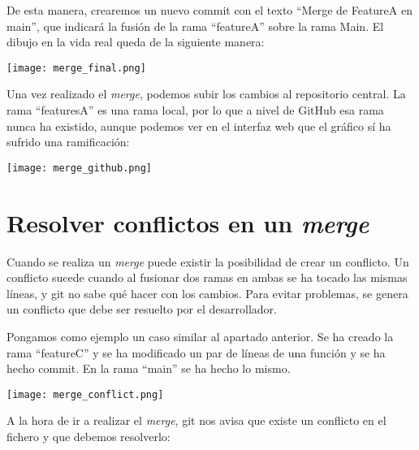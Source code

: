 De esta manera, crearemos un nuevo commit con el texto “Merge de FeatureA en main”, que indicará la fusión de la rama “featureA” sobre la rama Main. El dibujo en la vida real queda de la siguiente manera:


\begin{center}
    \texttt{[image: merge\_final.png]}
\end{center}

Una vez realizado el \textit{merge}, podemos subir los cambios al repositorio central. La rama “featuresA” es una rama local, por lo que a nivel de GitHub esa rama nunca ha existido, aunque podemos ver en el interfaz web que el gráfico sí ha sufrido una ramificación:

\begin{center}
    \texttt{[image: merge\_github.png]}
\end{center}


\chapter{Resolver conflictos en un \textit{merge}}

Cuando se realiza un \textit{merge} puede existir la posibilidad de crear un conflicto. Un conflicto sucede cuando al fusionar dos ramas en ambas se ha tocado las mismas líneas, y git no sabe qué hacer con los cambios. Para evitar problemas, se genera un conflicto que debe ser resuelto por el desarrollador.


Pongamos como ejemplo un caso similar al apartado anterior. Se ha creado la rama “featureC” y se ha modificado un par de líneas de una función y se ha hecho commit. En la rama “main” se ha hecho lo mismo.

\begin{center}
    \texttt{[image: merge\_conflict.png]}
\end{center}

A la hora de ir a realizar el \textit{merge}, git nos avisa que existe un conflicto en el fichero  y que debemos resolverlo:

